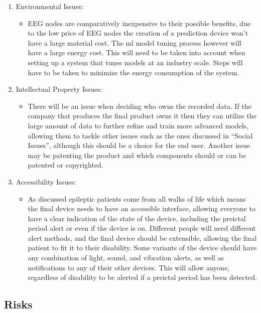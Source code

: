 \documentclass[12pt]{article}
\begin{document}
\begin{enumerate}
\begin{itemize}
    \end{itemize}
        \item Environmental Issues:
    \begin{itemize}
    	 \item EEG nodes are comparatively inexpensive to their possible benefits, due to the low price of EEG nodes the creation of a prediction device won't have a large material cost. The \acrshort{ml} model tuning process however will have a large energy cost. This will need to be taken into account when setting up a system that tunes models at an industry scale. Steps will have to be taken to minimize the energy consumption of the system.
    \end{itemize}
            \item Intellectual Property Issues:
    \begin{itemize}
    	 \item There will be an issue when deciding who owns the recorded data. If the company that produces the final product owns it then they can utilize the large amount of data to further refine and train more advanced models, allowing them to tackle other issues such as the ones discussed in ``Social Issues'', although this should be a choice for the end user. Another issue may be patenting the product and which components should or can be patented or copyrighted.
    \end{itemize}
        \item Accessibility Issues:
    \begin{itemize}
    	 \item As discussed epileptic patients come from all walks of life which means the final device needs to have an accessible interface, allowing everyone to have a clear indication of the state of the device, including the preictal period alert or even if the device is on. Different people will need different alert methods, and the final device should be extensible, allowing the final patient to fit it to their disability. Some variants of the device should have any combination of light, sound, and vibration alerts, as well as notifications to any of their other devices. This will allow anyone, regardless of disability to be alerted if a preictal period has been detected.
    \end{itemize}
\end{enumerate}

\subsection{Risks}
\end{document}
